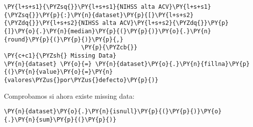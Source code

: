 \begin{tcolorbox}[breakable, size=fbox, boxrule=1pt, pad at break*=1mm,colback=cellbackground, colframe=cellborder]
\begin{Verbatim}[commandchars=\\\{\}]
                       \PY{l+s+s1}{\PYZsq{}}\PY{l+s+s1}{NIHSS alta ACV}\PY{l+s+s1}{\PYZsq{}}\PY{p}{:}\PY{n}{dataset}\PY{p}{[}\PY{l+s+s2}{\PYZdq{}}\PY{l+s+s2}{NIHSS alta ACV}\PY{l+s+s2}{\PYZdq{}}\PY{p}{]}\PY{o}{.}\PY{n}{median}\PY{p}{(}\PY{p}{)}\PY{o}{.}\PY{n}{round}\PY{p}{(}\PY{p}{)}\PY{p}{,} 
                      \PY{p}{\PYZcb{}}
\PY{c+c1}{\PYZsh{} Missing Data}
\PY{n}{dataset} \PY{o}{=} \PY{n}{dataset}\PY{o}{.}\PY{n}{fillna}\PY{p}{(}\PY{n}{value}\PY{o}{=}\PY{n}{valores\PYZus{}por\PYZus{}defecto}\PY{p}{)}
\end{Verbatim}
\end{tcolorbox}

    Comprobamos si ahora existe missing data:

    \begin{tcolorbox}[breakable, size=fbox, boxrule=1pt, pad at break*=1mm,colback=cellbackground, colframe=cellborder]
\begin{Verbatim}[commandchars=\\\{\}]
\PY{n}{dataset}\PY{o}{.}\PY{n}{isnull}\PY{p}{(}\PY{p}{)}\PY{o}{.}\PY{n}{sum}\PY{p}{(}\PY{p}{)}
\end{Verbatim}
\end{tcolorbox}

 \begin{table}[H]
\centering
\setlength{\tabcolsep}{5pt}
\caption{Missing data finalizado}
\label{tab:missing data finalizado}
\end{table}
        
